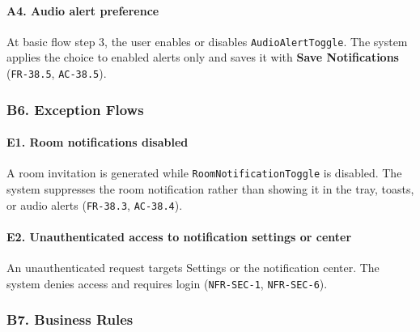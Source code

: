\documentclass[12pt]{article}
\begin{document}
\hypertarget{sec:a4-audio-alert-preference}{}
\paragraph*{A4. Audio alert preference}
\par\medskip

At basic flow step 3, the user enables or disables \texttt{AudioAlertToggle}. The system applies the choice to enabled alerts only and saves it with \textbf{Save Notifications} (\texttt{FR-38.5}, \texttt{AC-38.5}).
\par\medskip

\hypertarget{sec:b6-exception-flows}{}
\subsubsection*{B6. Exception Flows}
\par\medskip

\hypertarget{sec:e1-room-notifications-disabled}{}
\paragraph*{E1. Room notifications disabled}
\par\medskip

A room invitation is generated while \texttt{RoomNotificationToggle} is disabled. The system suppresses the room notification rather than showing it in the tray, toasts, or audio alerts (\texttt{FR-38.3}, \texttt{AC-38.4}).
\par\medskip

\hypertarget{sec:e2-unauthenticated-access-to-notification-settings-or-center}{}
\paragraph*{E2. Unauthenticated access to notification settings or center}
\par\medskip

An unauthenticated request targets Settings or the notification center. The system denies access and requires login (\texttt{NFR-SEC-1}, \texttt{NFR-SEC-6}).
\par\medskip

\hypertarget{sec:b7-business-rules}{}
\subsubsection*{B7. Business Rules}
\par\medskip
\end{document}
